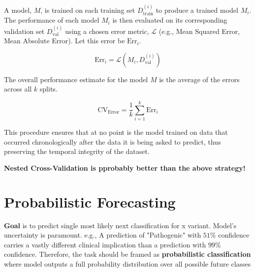 \documentclass[../main.tex]{subfiles}
\begin{document}
A model, $M$, is trained on each training set $D_{\text{train}}^{(i)}$ to produce a trained model $M_i$. The performance of each model $M_i$ is then evaluated on its corresponding validation set $D_{\text{val}}^{(i)}$ using a chosen error metric, $\mathcal{L}$ (e.g., Mean Squared Error, Mean Absolute Error). Let this error be $\text{Err}_i$.

\begin{equation}
    \text{Err}_i = \mathcal{L}(M_i, D_{\text{val}}^{(i)})
\end{equation}

The overall performance estimate for the model $M$ is the average of the errors across all $k$ splits.

\begin{equation}
    \text{CV}_{\text{Error}} = \frac{1}{k} \sum_{i=1}^{k} \text{Err}_i
\end{equation}

This procedure ensures that at no point is the model trained on data that occurred chronologically after the data it is being asked to predict, thus preserving the temporal integrity of the dataset.

\vspace{0.3cm}

\textbf{Nested Cross-Validation is pprobably better than the above strategy!}

\section{Probabilistic Forecasting}
\textbf{Goal} is to predict single most likely next classification for x variant. Model's uncertainty is paramount. e.g., A prediction of "Pathogenic" with $51\%$ confidence carries a vastly different clinical implication than a prediction with $99\%$ confidence. Therefore, the task should be framed as \textbf{probabilistic classification} where model outputs a full probability distribution over all possible future classes
\end{document}

